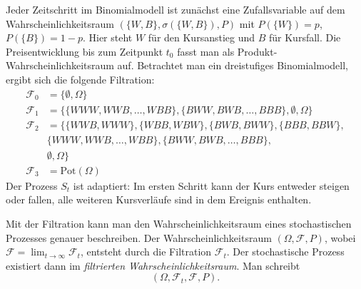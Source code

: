 \begin{bsp}
Jeder Zeitschritt im Binomialmodell ist zunächst eine Zufallsvariable auf dem 
Wahrscheinlichkeitsraum $(\{W, B\}, \sigma(\{W, B\}), P)$ mit 
$P(\{W \}) = p$, $P(\{B \}) = 1-p$. Hier steht $W$ für den Kursanstieg und $B$ für Kursfall. Die Preisentwicklung bis zum Zeitpunkt $t_0$ fasst man als Produkt-Wahrscheinlichkeitsraum auf.
Betrachtet man ein dreistufiges Binomialmodell, ergibt sich die folgende Filtration: 
$$
\begin{aligned}
\mathcal F_0 &= \{\emptyset, \Omega\} \\
\mathcal F_1 &= \{\{WWW, WWB, \dots, WBB \}, \{ BWW, BWB, \dots, BBB \},\emptyset, \Omega \} \\ 
\mathcal F_2 &= \{ \{WWB, WWW \}, \{WBB, WBW \}, \{BWB, BWW \}, \{BBB, BBW \}, \\ &\{WWW, WWB, \dots, WBB \}, \{ BWW, BWB, \dots, BBB \}, \\ &\emptyset, \Omega \} \\
\mathcal F_3 &= \text{Pot}(\Omega)
\end{aligned}
$$
Der Prozess $S_t$ ist adaptiert: Im ersten Schritt kann der Kurs entweder steigen oder
fallen, alle weiteren Kursverläufe sind in dem Ereignis enthalten.

\end{bsp}

\begin{defi}
Mit der Filtration kann man den Wahrscheinlichkeitsraum eines stochastischen Prozesses genauer beschreiben. 
Der Wahrscheinlichkeitsraum $(\Omega, \mathcal F, P)$, wobei $\mathcal F = \lim_{t \to \infty} \mathcal F_t$, entsteht durch die Filtration $\mathcal F_t$.
Der stochastische Prozess existiert dann im \textit{filtrierten Wahrscheinlichkeitsraum}. Man schreibt
$$
(\Omega, \mathcal F_t, \mathcal F, P).
$$
\end{defi}


